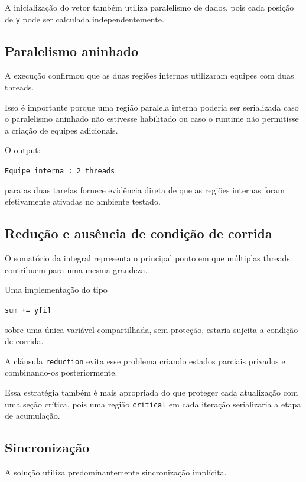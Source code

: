 A inicialização do vetor também utiliza paralelismo de dados, pois cada
posição de \texttt{y} pode ser calculada independentemente.


\subsection{Paralelismo aninhado}

A execução confirmou que as duas regiões internas utilizaram equipes com duas
threads.

Isso é importante porque uma região paralela interna poderia ser serializada
caso o paralelismo aninhado não estivesse habilitado ou caso o runtime não
permitisse a criação de equipes adicionais.

O output:

\begin{center}
\texttt{Equipe interna : 2 threads}
\end{center}

para as duas tarefas fornece evidência direta de que as regiões internas
foram efetivamente ativadas no ambiente testado.


\subsection{Redução e ausência de condição de corrida}

O somatório da integral representa o principal ponto em que múltiplas threads
contribuem para uma mesma grandeza.

Uma implementação do tipo

\begin{center}
\texttt{sum += y[i]}
\end{center}

sobre uma única variável compartilhada, sem proteção, estaria sujeita a
condição de corrida.

A cláusula \texttt{reduction} evita esse problema criando estados parciais
privados e combinando-os posteriormente.

Essa estratégia também é mais apropriada do que proteger cada atualização
com uma seção crítica, pois uma região \texttt{critical} em cada iteração
serializaria a etapa de acumulação.


\subsection{Sincronização}

A solução utiliza predominantemente sincronização implícita.

